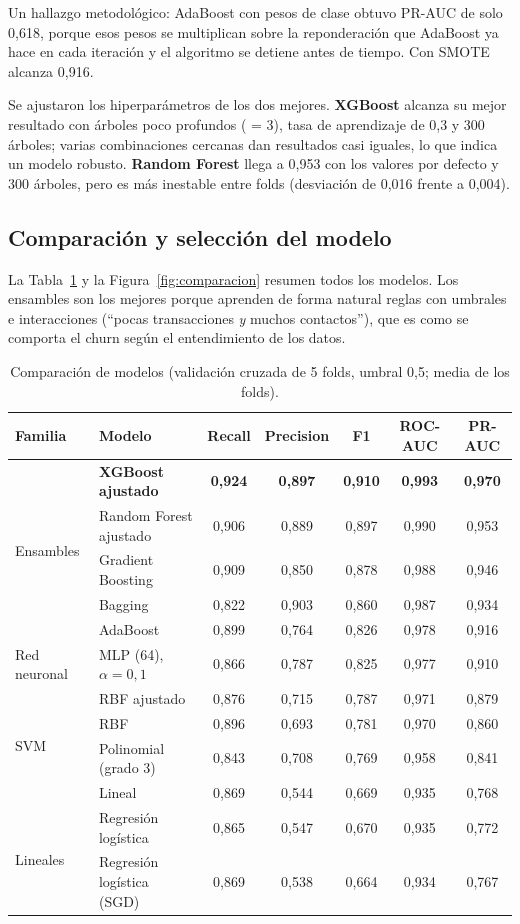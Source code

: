 \documentclass[11pt,a4paper]{article}
\newcommand{\var}[1]{\texttt{\detokenize{#1}}}
\begin{document}
Un hallazgo metodológico: AdaBoost con pesos de clase obtuvo PR-AUC de solo 0,618, porque esos pesos se multiplican sobre la reponderación que AdaBoost ya hace en cada iteración y el algoritmo se detiene antes de tiempo. Con SMOTE alcanza 0,916.

Se ajustaron los hiperparámetros de los dos mejores. \textbf{XGBoost} alcanza su mejor resultado con árboles poco profundos (\var{max_depth} = 3), tasa de aprendizaje de 0,3 y 300 árboles; varias combinaciones cercanas dan resultados casi iguales, lo que indica un modelo robusto. \textbf{Random Forest} llega a 0,953 con los valores por defecto y 300 árboles, pero es más inestable entre folds (desviación de 0,016 frente a 0,004).

\subsection{Comparación y selección del modelo}

La Tabla~\ref{tab:comparacion} y la Figura~\ref{fig:comparacion} resumen todos los modelos. Los ensambles son los mejores porque aprenden de forma natural reglas con umbrales e interacciones (``pocas transacciones \emph{y} muchos contactos''), que es como se comporta el churn según el entendimiento de los datos.

\begin{table}[H]
  \centering
  \caption{Comparación de modelos (validación cruzada de 5 folds, umbral 0,5; media de los folds).}
  \label{tab:comparacion}
  \small
  \begin{tabular}{llccccc}
    \toprule
    Familia & Modelo & Recall & Precision & F1 & ROC-AUC & PR-AUC \\
    \midrule
    \multirow{5}{*}{Ensambles} & \textbf{XGBoost ajustado} & \textbf{0,924} & \textbf{0,897} & \textbf{0,910} & \textbf{0,993} & \textbf{0,970} \\
     & Random Forest ajustado & 0,906 & 0,889 & 0,897 & 0,990 & 0,953 \\
     & Gradient Boosting & 0,909 & 0,850 & 0,878 & 0,988 & 0,946 \\
     & Bagging & 0,822 & 0,903 & 0,860 & 0,987 & 0,934 \\
     & AdaBoost & 0,899 & 0,764 & 0,826 & 0,978 & 0,916 \\
    \midrule
    Red neuronal & MLP (64), $\alpha=0{,}1$ & 0,866 & 0,787 & 0,825 & 0,977 & 0,910 \\
    \midrule
    \multirow{4}{*}{SVM} & RBF ajustado & 0,876 & 0,715 & 0,787 & 0,971 & 0,879 \\
     & RBF & 0,896 & 0,693 & 0,781 & 0,970 & 0,860 \\
     & Polinomial (grado 3) & 0,843 & 0,708 & 0,769 & 0,958 & 0,841 \\
     & Lineal & 0,869 & 0,544 & 0,669 & 0,935 & 0,768 \\
    \midrule
    \multirow{2}{*}{Lineales} & Regresión logística & 0,865 & 0,547 & 0,670 & 0,935 & 0,772 \\
     & Regresión logística (SGD) & 0,869 & 0,538 & 0,664 & 0,934 & 0,767 \\
    \bottomrule
  \end{tabular}
\end{table}
\end{document}
